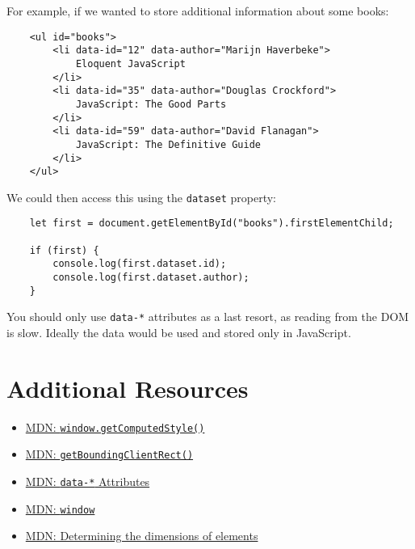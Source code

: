 For example, if we wanted to store additional information about some books:

\begin{verbatim}
    <ul id="books">
        <li data-id="12" data-author="Marijn Haverbeke">
            Eloquent JavaScript
        </li>
        <li data-id="35" data-author="Douglas Crockford">
            JavaScript: The Good Parts
        </li>
        <li data-id="59" data-author="David Flanagan">
            JavaScript: The Definitive Guide
        </li>
    </ul>
\end{verbatim}

\pagebreak

We could then access this using the \texttt{dataset} property:

\begin{verbatim}
    let first = document.getElementById("books").firstElementChild;

    if (first) {
        console.log(first.dataset.id);
        console.log(first.dataset.author);
    }
\end{verbatim}

You should only use \texttt{data-*} attributes as a last resort, as reading from the DOM is slow. Ideally the data would be used and stored only in JavaScript.



\section{Additional Resources}

\begin{itemize}[leftmargin=*]
    \item \href{https://developer.mozilla.org/en-US/docs/Web/API/Window/getComputedStyle}{MDN: \texttt{window.getComputedStyle()}}
    \item \href{https://developer.mozilla.org/en-US/docs/Web/API/Element/getBoundingClientRect}{MDN: \texttt{getBoundingClientRect()}}
    \item \href{https://developer.mozilla.org/en-US/docs/Learn/HTML/Howto/Use_data_attributes}{MDN: \texttt{data-*} Attributes}
    \item \href{https://developer.mozilla.org/en-US/docs/Web/API/Window}{MDN: \texttt{window}}
    \item \href{https://developer.mozilla.org/en-US/docs/Web/API/CSS_Object_Model/Determining_the_dimensions_of_elements}{MDN: Determining the dimensions of elements}
\end{itemize}
